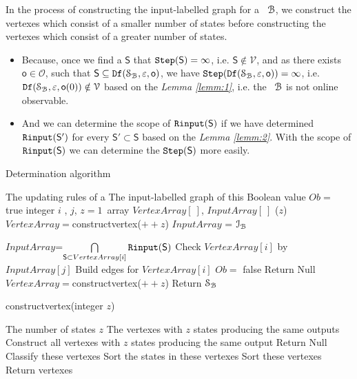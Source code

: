  In the process of constructing the input-labelled graph for a \BCN\ ${\mathcal{B}}$, we construct the vertexes which consist of a smaller number of states before constructing the vertexes which consist of a greater number of states.
\begin{itemize}
\item  Because, once we find a $\mathsf{S}$ that ${\tt Step}(\mathsf{S})= \infty$, i.e. $\mathsf{S}\notin \mathcal{V}$, and as there exists $\mathsf{o}\in \mathcal{O}$, such that $\mathsf{S}\subseteq {\tt Df}(\mathcal{S}_{\mathcal{B}},\varepsilon, \mathsf{o})$, we have ${\tt Step}({\tt Df}(\mathcal{S}_{\mathcal{B}},\varepsilon, \mathsf{o}))= \infty$, i.e. ${\tt Df}(\mathcal{S}_{\mathcal{B}},\varepsilon, \mathsf{o}(0))\notin \mathcal{V}$ based on the {\em Lemma \ref{lemm:1}}, i.e. the \BCN\ ${\mathcal{B}}$ is not online observable.
\item  And we can determine the scope of ${\tt Rinput}(\mathsf{S})$ if we have determined ${\tt Rinput}(\mathsf{S}')$ for every $\mathsf{S}'\subset\mathsf{S}$ based on the {\em Lemma \ref{lemm:2}}. With the scope of ${\tt Rinput}(\mathsf{S})$ we can determine the ${\tt Step}(\mathsf{S})$ more easily.
 \end{itemize} %

\begin{algorithm}[h]
\caption{Determination algorithm}
\begin{algorithmic}[1]
\REQUIRE 
The updating rules of a \BCN
\ENSURE  
The input-labelled graph of this \BCN
\STATE Boolean value $Ob=$ true 
\STATE integer $i$ , $j$, $z=1$\
\STATE array $VertexArray[\ ]$, $InputArray[\ ]$
($z$)
\STATE $VertexArray=${\sf constructvertex}($++z$)
\STATE $InputArray$ = $\mathcal{I}_{\mathcal{B}}$ 
\ELSE

\STATE $InputArray$=$\mathop{\bigcap}\limits_{\mathsf{S}\subset VertexArray[i]} {\tt Rinput}(\mathsf{S}) $ 
\ENDIF
{}
\STATE Check $VertexArray[i]$ by $InputArray[j]$ 
\STATE Build edges for $VertexArray[i]$ 
\ENDFOR
{}
\STATE  $Ob=$ false 
\STATE Return Null
\ENDIF
\ENDFOR
\STATE $VertexArray=${\sf constructvertex}($++z$)
\ENDWHILE
\STATE Return $\mathcal{S}_{\mathcal{B}}$\
\end{algorithmic}
 \label{alg:1}
\end{algorithm}


\begin{algorithm}[h!]
\caption{{\sf constructvertex}(integer $z$)}
\begin{algorithmic}[1]
\REQUIRE 
The number of states $z$
\ENSURE  
The vertexes with $z$ states producing the same outputs 
\STATE  Construct all vertexes with $z$ states producing the same output 
\IF{(Failed to construct)} 
\STATE  Return Null
\ELSE 
\STATE  Classify these vertexes
\STATE Sort the states in these vertexes
\STATE Sort these vertexes
\STATE Return vertexes
\ENDIF 
\end{algorithmic}
 \label{alg:2}
\end{algorithm}

